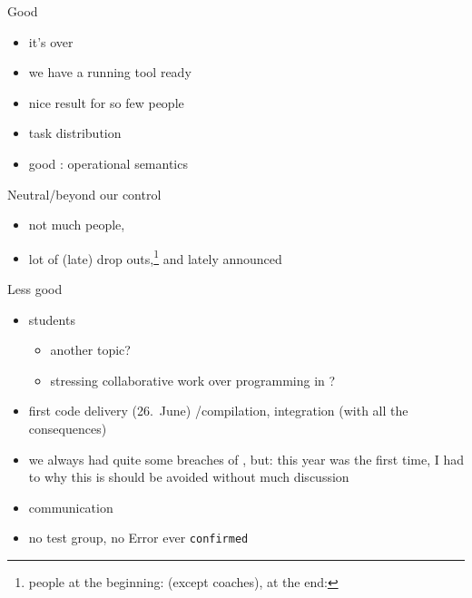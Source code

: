 \begin{myslide}{Good}
  \begin{itemize}
  \item it's over
  \item we have a running tool ready
  \item nice result for so few people
  \item task distribution
  \item good :  operational
    semantics
  \end{itemize}
  
\end{myslide}
\begin{myslide}{Neutral/beyond our control}
  \begin{itemize}
  \item not much people, 
  \item lot of (late) drop outs,\footnote{people at the beginning:
       (except coaches), at the end: } and
    lately announced
  \end{itemize}
\end{myslide}

\begin{myslide}{Less good}
  \begin{itemize}
  \item {} students
    \begin{itemize}
    \item another topic?
    \item stressing collaborative  work over programming in \Java?
    \end{itemize}
  \item {} first code delivery (26.\ June) /compilation,
     integration (with all the consequences)
  \item we always had quite some breaches of , but:
    this year was the first time, I had to  why this is
    should be avoided without much discussion
  \item communication
  \item no test group, no Error ever \texttt{confirmed}
  \end{itemize}
\end{myslide}

